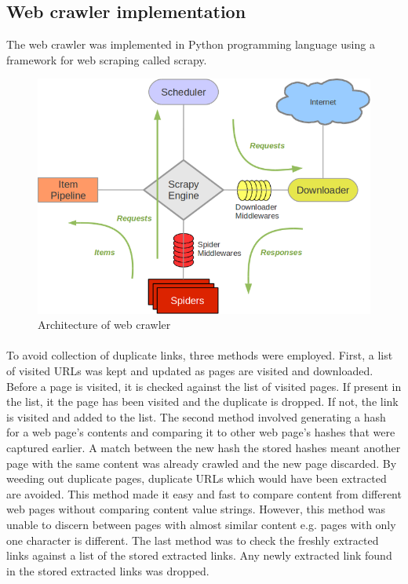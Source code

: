 \subsection{Web crawler implementation}
The web crawler was implemented in Python programming language using a framework for web scraping called scrapy.
\begin{figure}[H]
	\includegraphics[width=\linewidth,scale=0.5]{../static/img/scrapy.png}
	\caption{Architecture of web crawler}
\end{figure}

\paragraph{}
To avoid collection of duplicate links, three methods were employed. First, a list of visited URLs was kept and updated as pages are visited and downloaded. Before a page is visited, it is checked against the list of visited pages. If present in the list, it the page has been visited and the duplicate is dropped. If not, the link is visited and added to the list. The second method involved generating a hash for a web page's contents and comparing it to other web page's hashes that were captured earlier. A match between the new hash the stored hashes meant another page with the same content was already crawled and the new page discarded. By weeding out duplicate pages, duplicate URLs which would have been extracted are avoided. This method made it easy and fast to compare content from different web pages without comparing content value strings. However, this method was unable to discern between pages with almost similar content e.g. pages with only one character is different. The last method was to check the freshly extracted links against a list of the stored extracted links. Any newly extracted link found in the stored extracted links was dropped.

